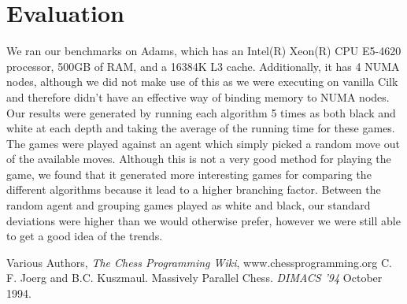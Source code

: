 \documentclass[]{article}
\begin{document}
\section{Evaluation}
We ran our benchmarks on Adams, which has an Intel(R) Xeon(R) CPU E5-4620 processor, 500GB of RAM, and a 16384K L3 cache.  Additionally, it has 4 NUMA nodes, although we did not make use of this as we were executing on vanilla Cilk and therefore didn't have an effective way of binding memory to NUMA nodes.  Our results were generated by running each algorithm 5 times as both black and white at each depth and taking the average of the running time for these games.  The games were played against an agent which simply picked a random move out of the available moves.  Although this is not a very good method for playing the game, we found that it generated more interesting games for comparing the different algorithms because it lead to a higher branching factor.  Between the random agent and grouping games played as white and black, our standard deviations were higher than we would otherwise prefer, however we were still able to get a good idea of the trends.
\begin{thebibliography}{9}
  Various Authors,
  \textit{The Chess Programming Wiki},
  www.chessprogramming.org
  C. F. Joerg and B.C. Kuszmaul.
  Massively Parallel Chess.
  \textit{DIMACS '94}
  October 1994.
\end{thebibliography}
\end{document}

